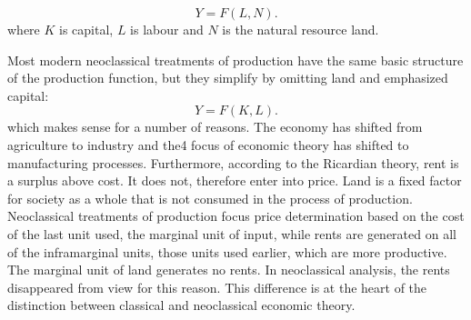 \begin{equation} 
Y=F(L,N).
\label{eqn-production-ricardo-2}
\end{equation} 
where $K$ is capital, $L$ is labour and $N$  is the natural resource  land.

Most modern neoclassical treatments of production have the same basic structure of the production function, but they simplify by omitting land and emphasized capital:
\begin{equation} 
Y=F(K,L).
\label{eqn-production}
\end{equation}  
which makes sense for a number of reasons. The economy has shifted from agriculture to industry and the4 focus of economic theory has shifted to manufacturing processes.
Furthermore, according to the Ricardian theory, rent is a surplus above cost. It does not, therefore enter into price. Land is a fixed factor for society as a whole that is not consumed in  the process of production.  Neoclassical treatments of production focus price determination based on the cost of the last unit used, the marginal  unit of input, while rents are generated on all of the inframarginal units, those units used earlier, which are more productive. The marginal unit of land generates no rents. In neoclassical analysis, the rents disappeared from view for this reason. This difference is at the heart of the distinction between classical and neoclassical economic theory. 


